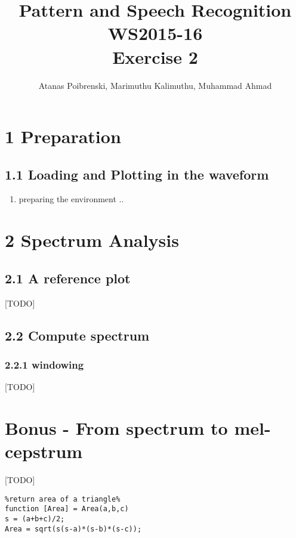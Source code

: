 \documentclass[a4paper]{article}
\title{Pattern and Speech Recognition WS2015-16 \\ Exercise 2}
\author{Atanas Poibrenski, Marimuthu Kalimuthu, Muhammad Ahmad}
\begin{document}
\maketitle

\section*{1 Preparation}
\subsection*{1.1 Loading and Plotting in the waveform}

\begin{enumerate}
\item preparing the environment ..
  
\begin{figure}[h]
\end{figure}

\end{enumerate}

\section*{2 Spectrum Analysis}
\subsection*{2.1 A reference plot}
\hspace*{12pt}[TODO]

\subsection*{2.2 Compute spectrum}
\subsubsection*{2.2.1 windowing}
\hspace*{12pt}[TODO]

\section*{Bonus - From spectrum to mel-cepstrum}
\hspace*{12pt}[TODO]



\vspace{1em}

\begin{lstlisting}
%return area of a triangle%
function [Area] = Area(a,b,c)
s = (a+b+c)/2;
Area = sqrt(s(s-a)*(s-b)*(s-c));
\end{lstlisting}
\end{document}
